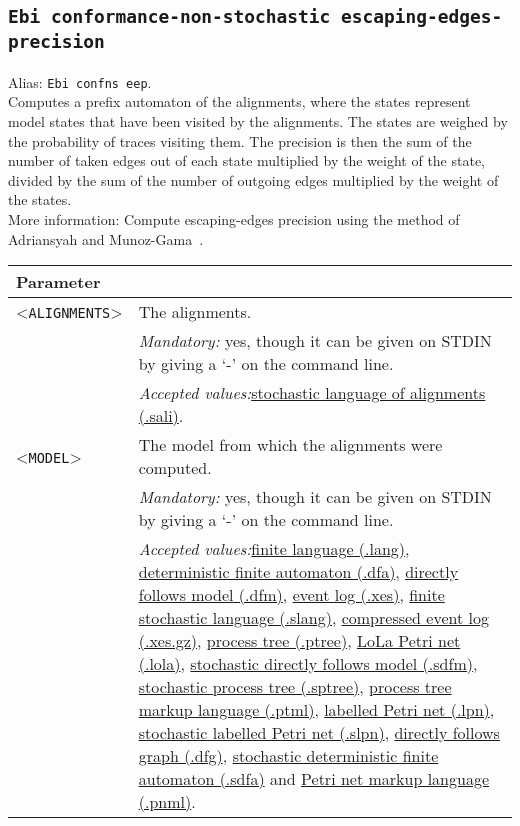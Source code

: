 {\subsection{\texttt{Ebi conformance-non-stochastic escaping-edges-precision}}
\label{command:Ebi conformance-non-stochastic escaping-edges-precision}
Alias: \texttt{Ebi confns eep}.\\
Computes a prefix automaton of the alignments, where the states represent model states that have been visited by the alignments. The states are weighed by the probability of traces visiting them. The precision is then the sum of the number of taken edges out of each state multiplied by the weight of the state, divided by the sum of the number of outgoing edges multiplied by the weight of the states.\\
More information: Compute escaping-edges precision using the method of Adriansyah and Munoz-Gama~\cite{DBLP:conf/bpm/AdriansyahMCDA12}.\\
\begin{tabularx}{\linewidth}{lX}
\toprule
Parameter \\\midrule
<\texttt{ALIGNMENTS}>&The alignments.\\
&\textit{Mandatory:} \quad yes, though it can be given on STDIN by giving a `-' on the command line.\\
&\textit{Accepted values:}\quad \hyperref[filehandler:stochastic language of alignments]{stochastic language of alignments (.sali)}.\\
<\texttt{MODEL}>&The model from which the alignments were computed.\\
&\textit{Mandatory:} \quad yes, though it can be given on STDIN by giving a `-' on the command line.\\
&\textit{Accepted values:}\quad \hyperref[filehandler:finite language]{finite language (.lang)}, \hyperref[filehandler:deterministic finite automaton]{deterministic finite automaton (.dfa)}, \hyperref[filehandler:directly follows model]{directly follows model (.dfm)}, \hyperref[filehandler:event log]{event log (.xes)}, \hyperref[filehandler:finite stochastic language]{finite stochastic language (.slang)}, \hyperref[filehandler:compressed event log]{compressed event log (.xes.gz)}, \hyperref[filehandler:process tree]{process tree (.ptree)}, \hyperref[filehandler:LoLa Petri net]{LoLa Petri net (.lola)}, \hyperref[filehandler:stochastic directly follows model]{stochastic directly follows model (.sdfm)}, \hyperref[filehandler:stochastic process tree]{stochastic process tree (.sptree)}, \hyperref[filehandler:process tree markup language]{process tree markup language (.ptml)}, \hyperref[filehandler:labelled Petri net]{labelled Petri net (.lpn)}, \hyperref[filehandler:stochastic labelled Petri net]{stochastic labelled Petri net (.slpn)}, \hyperref[filehandler:directly follows graph]{directly follows graph (.dfg)}, \hyperref[filehandler:stochastic deterministic finite automaton]{stochastic deterministic finite automaton (.sdfa)} and \hyperref[filehandler:Petri net markup language]{Petri net markup language (.pnml)}.\\

\end{tabularx}}
